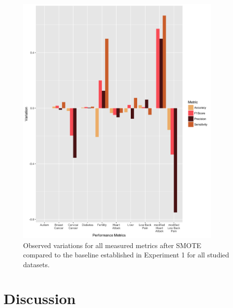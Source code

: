 \begin{figure}[!htbp]
    \centering
    \includegraphics[width=0.9\textwidth]{ThesisTemplate/usingLatex/chapter5Images/OverVariations.png}
    \caption{Observed variations for all measured metrics after SMOTE compared to the baseline established in Experiment 1 for all studied datasets.}
    \label{fig:my_label}
\end{figure}






\section{Discussion}
